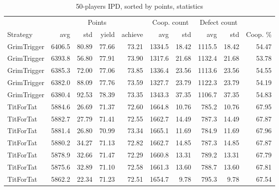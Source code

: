 \documentclass[journal,10pt,twoside]{IEEEtran}
\begin{document}
\begin{table}[ht]
	\caption{50-players IPD, sorted by points, statistics}
	\label{tab:ipdmp50}
	\centering
	\begin{tabular}{l|rrrr|rrrrr} \toprule
		                  &     \multicolumn{4}{c}{Points}     & \multicolumn{2}{c}{Coop. count} & \multicolumn{2}{c}{Defect count} &          \\
		Strategy          &    avg &    std &  yield & achieve &    avg &                    std &    avg &                     std & Coop. \% \\ \midrule
		GrimTrigger       & 6406.5 &  80.89 &  77.66 &   73.21 & 1334.5 &                  18.42 & 1115.5 &                   18.42 &    54.47 \\
		GrimTrigger       & 6393.8 &  56.80 &  77.91 &   73.90 & 1317.6 &                  21.68 & 1132.4 &                   21.68 &    53.78 \\
		GrimTrigger       & 6385.3 &  72.00 &  77.06 &   73.85 & 1336.4 &                  23.56 & 1113.6 &                   23.56 &    54.55 \\
		GrimTrigger       & 6382.0 &  88.09 &  77.76 &   73.59 & 1327.7 &                  23.79 & 1122.3 &                   23.79 &    54.19 \\
		GrimTrigger       & 6380.4 &  92.53 &  78.39 &   73.35 & 1343.3 &                  37.35 & 1106.7 &                   37.35 &    54.83 \\
		TitForTat         & 5884.6 &  26.69 &  71.37 &   72.60 & 1664.8 &                  10.76 &  785.2 &                   10.76 &    67.95 \\
		TitForTat         & 5882.7 &  27.79 &  71.41 &   72.55 & 1662.7 &                  14.49 &  787.3 &                   14.49 &    67.87 \\
		TitForTat         & 5881.4 &  26.80 &  70.99 &   73.34 & 1665.1 &                  11.69 &  784.9 &                   11.69 &    67.96 \\
		TitForTat         & 5880.2 &  34.27 &  71.13 &   72.82 & 1662.7 &                  14.85 &  787.3 &                   14.85 &    67.87 \\
		TitForTat         & 5878.9 &  32.66 &  71.47 &   72.29 & 1660.8 &                  13.31 &  789.2 &                   13.31 &    67.79 \\
		TitForTat         & 5875.6 &  32.89 &  71.10 &   72.58 & 1661.3 &                  13.60 &  788.7 &                   13.60 &    67.81 \\
		TitForTat         & 5862.2 &  22.34 &  71.23 &   72.51 & 1654.7 &                   9.78 &  795.3 &                    9.78 &    67.54 \\

\end{tabular}
\end{table}
\end{document}
